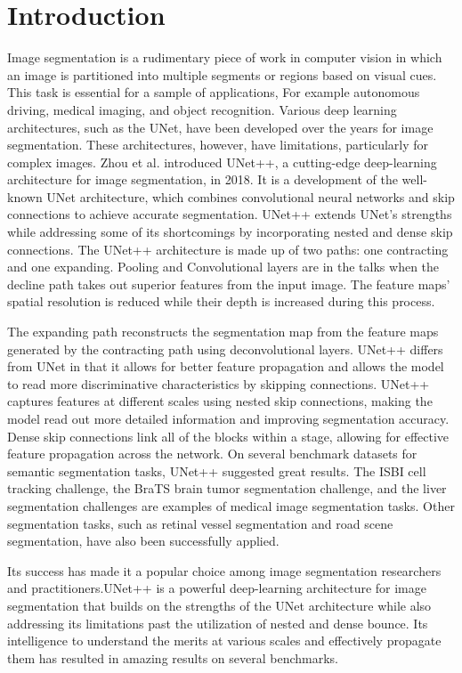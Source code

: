 \documentclass[conference]{IEEEtran}
\begin{document}
\section{Introduction}
Image segmentation is a rudimentary piece of work  in computer vision in which an image is partitioned into multiple segments or regions based on visual cues. This task is essential for a sample of applications, For example autonomous driving, medical imaging, and object recognition. Various deep learning architectures, such as the UNet, have been developed over the years for image segmentation.
These architectures, however, have limitations, particularly for complex images. Zhou et al. introduced UNet++, a cutting-edge deep-learning architecture for image segmentation, in 2018. It is a development of the well-known UNet architecture, which combines convolutional neural networks and skip connections to achieve accurate segmentation. UNet++ extends UNet's strengths while addressing some of its shortcomings by incorporating nested and dense skip connections.
The UNet++ architecture is made up of two paths: one contracting and one expanding. Pooling and Convolutional layers are in the talks when  the decline path takes out superior features from the input image. The feature maps' spatial resolution is reduced while their depth is increased during this process.

The expanding path reconstructs the segmentation map from the feature maps generated by the contracting path using deconvolutional layers.
UNet++ differs from UNet in that it allows for better feature propagation and allows the model to read more discriminative  characteristics by skipping connections. UNet++ captures features at different scales using nested skip connections, making the model read out more detailed information and improving segmentation accuracy. Dense skip connections link all of the blocks within a stage, allowing for effective feature propagation across the network.
On several benchmark datasets for semantic segmentation tasks, UNet++ suggested great results. The ISBI cell tracking challenge, the BraTS brain tumor segmentation challenge, and the liver segmentation challenges are examples of medical image segmentation tasks. Other segmentation tasks, such as retinal vessel segmentation and road scene segmentation, have also been successfully applied.

Its success has made it a popular choice among image segmentation researchers and practitioners.UNet++ is a powerful deep-learning architecture for image segmentation that builds on the strengths of the UNet architecture while also addressing its limitations past the utilization of nested and dense bounce. Its intelligence to understand the merits at various scales and effectively propagate them has resulted in amazing results on several benchmarks.
\end{document}
